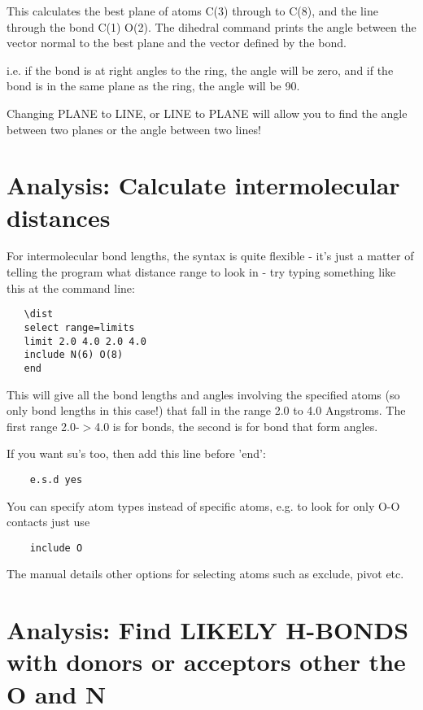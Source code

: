 \documentclass[10pt,a4paper]{report}
\begin{document}
This calculates the best plane of atoms C(3) through to C(8), and
the line through the bond C(1) O(2). The dihedral command prints
the angle between the vector normal to the best plane and the vector defined
by the bond.


i.e. if the bond is at right angles to the ring, the angle will be 
zero, and if the bond is in the same plane as the ring, the angle
will be 90.





Changing PLANE to LINE, or LINE to PLANE will allow you to find the
angle between two planes or the angle between two lines!

\section{Analysis: Calculate intermolecular distances}

For intermolecular bond lengths, the syntax is quite flexible - it's just
a matter of telling the program what distance range to look in - try
typing something like this at the command line:



\small\begin{verbatim}
   \dist
   select range=limits
   limit 2.0 4.0 2.0 4.0
   include N(6) O(8)
   end
\end{verbatim}\normalsize


This will give all the bond lengths and angles involving the 
specified atoms (so only bond lengths in this case!) that fall
in the range 2.0 to 4.0 Angstroms. The first range 2.0-$>$4.0 is
for bonds, the second is for bond that form angles.



If you want su's too, then add this line before 'end':


\small\begin{verbatim}
    e.s.d yes
\end{verbatim}\normalsize


You can specify atom types instead of specific atoms, e.g. to look
for only O-O contacts just use


\small\begin{verbatim}
    include O
\end{verbatim}\normalsize


The manual details other options for selecting atoms such as exclude,
pivot etc.

\section{Analysis: Find LIKELY H-BONDS with donors or acceptors other the O and N}
\end{document}

